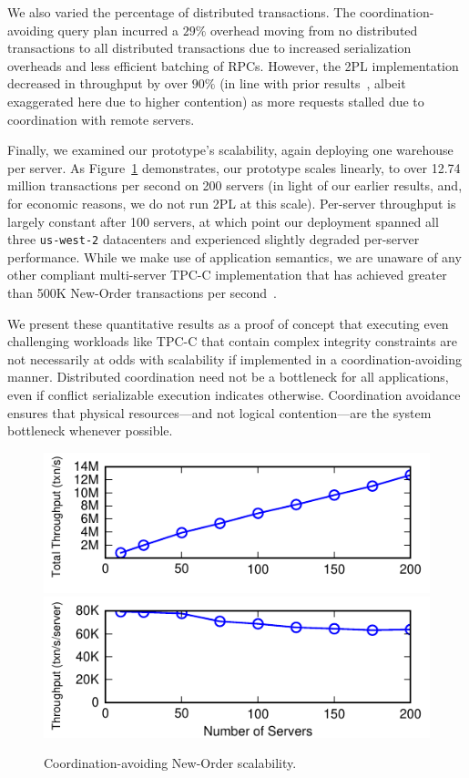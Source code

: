  We also varied the percentage of
distributed transactions. The coordination-avoiding query plan
incurred a $29\%$ overhead moving from no distributed transactions to
all distributed transactions due to increased serialization overheads
and less efficient batching of RPCs. However, the 2PL implementation decreased in throughput by over $90\%$ (in line
with prior results~\cite{abadi-vll,calvin}, albeit exaggerated here
due to higher contention) as more requests stalled due to coordination
with remote servers.

 Finally, we examined our prototype's scalability,
again deploying one warehouse per server. As Figure~\ref{fig:scaleout}
demonstrates, our prototype scales linearly, to over 12.74 million
transactions per second on 200 servers (in light of our earlier
results, and, for economic reasons, we do not run 2PL at this
scale). Per-server throughput is largely constant after 100 servers,
at which point our deployment spanned all three \texttt{us-west-2}
datacenters and experienced slightly degraded per-server performance.
While we make use of application semantics, we are unaware of
any other compliant multi-server TPC-C implementation that has
achieved greater than 500K New-Order transactions per
second~\cite{calvin,jones-dtxn,hstore,abadi-vll}.

 We present these quantitative results as a proof of
concept that executing even challenging workloads like TPC-C that
contain complex integrity constraints are not necessarily at odds with
scalability if implemented in a coordination-avoiding
manner. Distributed coordination need not be a bottleneck for all
applications, even if conflict serializable execution indicates
otherwise. Coordination avoidance ensures that physical
resources---and not logical contention---are the system bottleneck
whenever possible.

\begin{figure}
\includegraphics[width=\figscale\columnwidth]{figs/scale_thru_total.pdf}
\includegraphics[width=\figscale\columnwidth]{figs/scale_thru_each.pdf}\vspace{.5em}
\caption{Coordination-avoiding New-Order scalability.}
\label{fig:scaleout}
\end{figure}

